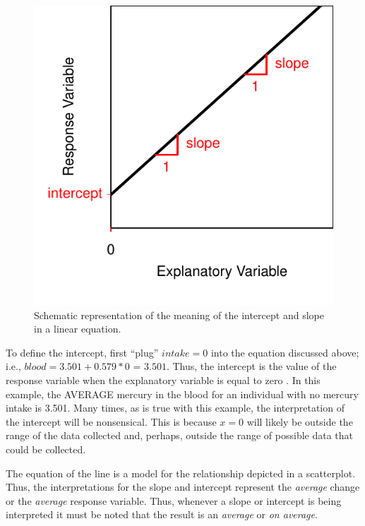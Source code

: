 \documentclass[10pt,openany]{book}\usepackage[]{graphicx}\usepackage[]{color}
\newenvironment{knitrout}{}{} %
\begin{document}
\begin{knitrout}
\color{fgcolor}\begin{figure}[hbtp]

{\centering \includegraphics[width=.4\linewidth]{Figs/SlopeInt-1} 

}

\caption[Schematic representation of the meaning of the intercept and slope in a linear equation]{Schematic representation of the meaning of the intercept and slope in a linear equation.}\label{fig:SlopeInt}
\end{figure}


\end{knitrout}

To define the intercept, first ``plug'' $intake=0$ into the equation discussed above; i.e., $blood=3.501+0.579*0$ = $3.501$. Thus, the intercept is the value of the response variable when the explanatory variable is equal to zero . In this example, the AVERAGE mercury in the blood for an individual with no mercury intake is 3.501. Many times, as is true with this example, the interpretation of the intercept will be nonsensical. This is because $x=0$ will likely be outside the range of the data collected and, perhaps, outside the range of possible data that could be collected.

The equation of the line is a model for the relationship depicted in a scatterplot. Thus, the interpretations for the slope and intercept represent the \textit{average} change or the \textit{average} response variable. Thus, whenever a slope or intercept is being interpreted it must be noted that the result is an \textit{average} or \textit{on average}.
\end{document}
